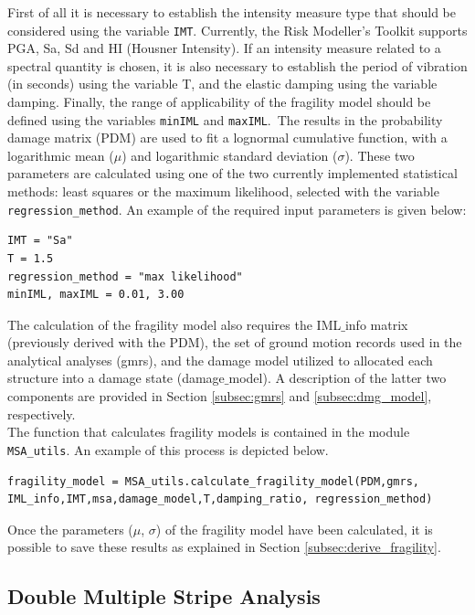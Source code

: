{First of all it is necessary to establish the intensity measure type that should be considered using the variable \verb=IMT=. Currently, the Risk Modeller’s Toolkit supports PGA, Sa, Sd and HI (Housner Intensity). If an intensity measure related to a spectral quantity is chosen, it is also necessary to establish the period of vibration (in seconds) using the variable T, and the elastic damping using the variable damping. Finally, the range of applicability of the fragility model should be defined using the variables \verb=minIML= and \verb=maxIML=.\
The results in the probability damage matrix (PDM) are used to fit a lognormal cumulative function, with a logarithmic mean ($\mu$) and logarithmic standard deviation ($\sigma$). These two parameters are calculated using one of the two currently implemented statistical methods: least squares or the maximum likelihood, selected with the variable \verb=regression_method=. An example of the required input parameters is given below:

\begin{Verbatim}[frame=single, commandchars=\\\{\}, samepage=true]
IMT = "Sa"
T = 1.5
regression_method = "max likelihood"
minIML, maxIML = 0.01, 3.00
\end{Verbatim}

The calculation of the fragility model also requires the IML$\_$info matrix (previously derived with the PDM), the set of ground motion records used in the analytical analyses (gmrs), and the damage model utilized to allocated each structure into a damage state (damage$\_$model). A description of the latter two components are provided in Section \ref{subsec:gmrs} and \ref{subsec:dmg_model}, respectively.\\
The function that calculates fragility models is contained in the module \verb=MSA_utils=. An example of this process is depicted below.

\begin{Verbatim}[frame=single, commandchars=\\\{\}, samepage=true]
fragility_model = MSA_utils.calculate_fragility_model(PDM,gmrs,
IML_info,IMT,msa,damage_model,T,damping_ratio, regression_method)
\end{Verbatim}

Once the parameters ($\mu$, $\sigma$) of the fragility model have been calculated, it is possible to save these results as explained in Section \ref{subsec:derive_fragility}.

\subsection{Double Multiple Stripe Analysis}
\label{subsec:2MSA}

}
